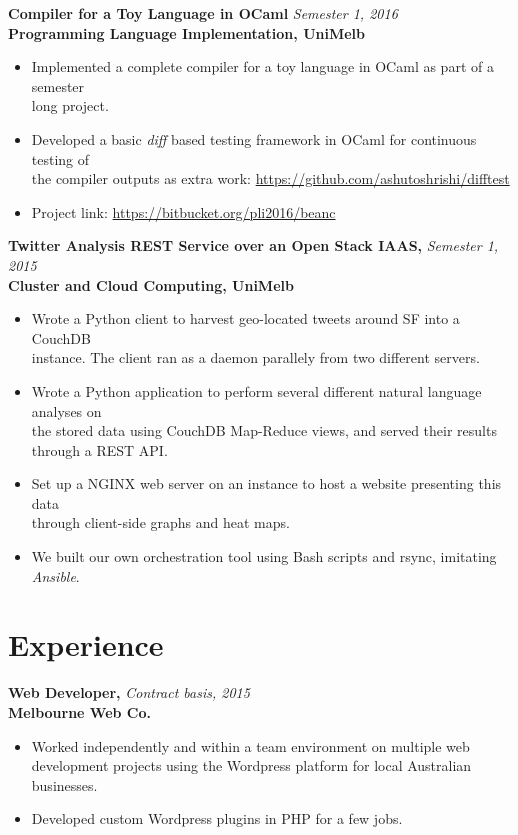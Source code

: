 \documentclass[a4paper,overlapped]{res}
\begin{document}
\begin{resume}
  \textbf{Compiler for a Toy Language in OCaml} \hfill \textit{Semester 1,
    2016}\\
  \textbf{Programming Language Implementation, UniMelb}
  \begin{itemize}
  \item Implemented a complete compiler for a toy language in OCaml as part of
    a semester\\ long project.
  \item Developed a basic \textit{diff} based testing framework in OCaml for
    continuous testing of \\ the compiler outputs as extra work:
    \url{https://github.com/ashutoshrishi/difftest}
  \item Project link: \url{https://bitbucket.org/pli2016/beanc}
  \end{itemize}
  

  \textbf{Twitter Analysis REST Service over an Open Stack IAAS,} 
  \hfill \textit{Semester 1, 2015}\\
  \textbf{Cluster and Cloud Computing, UniMelb}
  \begin{itemize}
  \item Wrote a Python client to harvest geo-located tweets around SF into a
    CouchDB \\
    instance. The client ran as a daemon parallely from two different servers.
  \item Wrote a Python application to perform several different natural
    language analyses on \\ the stored data using CouchDB Map-Reduce
    views, and served their results through a REST API.
  \item Set up a NGINX web server on an instance to host a website presenting
    this data \\ through client-side graphs and heat maps.
  \item We built our own orchestration tool using Bash scripts and rsync,
    imitating \textit{Ansible}.
    
  \end{itemize}
  

  \section{Experience}

  \textbf{Web Developer,} \hfill \textit{Contract basis, 2015}\\
  \textbf{Melbourne Web Co.}
  \begin{itemize}
  \item Worked independently and within a team environment on multiple web 
    development projects using the Wordpress platform for local Australian businesses.
  \item Developed custom Wordpress plugins in PHP for a few jobs.  
  \end{itemize}
  

\end{resume}
\end{document}
